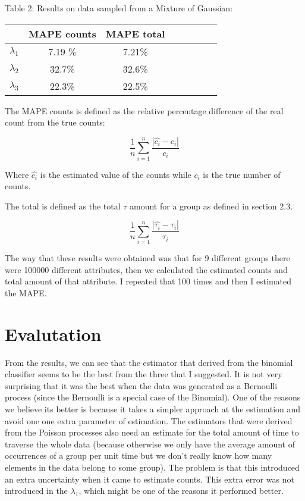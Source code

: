 \documentclass[a4paper]{article}
\begin{document}
Table 2: Results on data sampled from a Mixture of Gaussian:

\begin{tabular}{l*{6}{c}r}
  & MAPE counts & MAPE total  \\
\hline
$\lambda_1$ & 7.19 \% &  7.21\% \\
$\lambda_2$  & 32.7\% & 32.6\%   \\
$\lambda_3$  & 22.3\% & 22.5\%    \\
\end{tabular}

The MAPE counts is defined as the relative percentage difference of the real count from the true counts:

$$\frac{1}{n}\sum^{n}_{i=1}\frac{|\hat{c_i} - c_i|}{c_i}$$

Where $\hat{c_i}$ is the estimated value of the counts while $c_i$ is the true number of counts.

The total is defined as the total $\tau$ amount for a group as defined in section 2.3.  

$$\frac{1}{n}\sum^{n}_{i=1}\frac{|\hat{\tau_i} - \tau_i|}{\tau_i}$$

The way that these results were obtained was that for 9 different groups there were 100000 different attributes, then we calculated the estimated counts and total amount of that attribute.
I repeated that 100 times and then I estimated the MAPE.

\section{Evalutation}

From the results, we can see that the estimator that derived from the binomial classifier seems to be the best from the three that I suggested.
It is not very surprising that it was the best when the data was generated as a Bernoulli process (since the Bernoulli is a special case of the Binomial).
One of the reasons we believe its better is because it takes a simpler approach at the estimation and avoid one one extra parameter of estimation.
The estimators that were derived from the Poisson processes also need an estimate for the total amount of time to traverse the whole data (because otherwise we only have the average amount of occurrences of a group per unit time but we don't really know how many elements in the data belong to some group).
The problem is that this introduced an extra uncertainty when it came to estimate counts. 
This extra error was not introduced in the $\lambda_1$, which might be one of the reasons it performed better.
\end{document}
